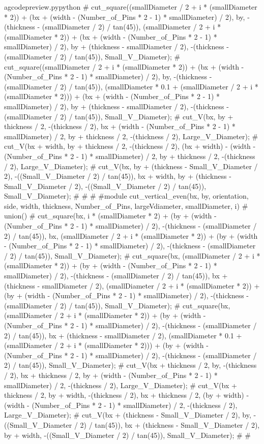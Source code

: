 \documentclass{ltxdoc}
\begin{document}
\begin{writecode}{a}{gcodepreview.py}{python}
{{#    cut_square((smallDiameter / 2 + i * (smallDiameter * 2)) + (bx + (width - (Number_of_Pins * 2 - 1) * smallDiameter) / 2), by, -(thickness - (smallDiameter / 2) / tan(45)), (smallDiameter / 2 + i * (smallDiameter * 2)) + (bx + (width - (Number_of_Pins * 2 - 1) * smallDiameter) / 2), by + (thickness - smallDiameter / 2), -(thickness - (smallDiameter / 2) / tan(45)), Small_V_Diameter);
#    cut_square((smallDiameter / 2 + i * (smallDiameter * 2)) + (bx + (width - (Number_of_Pins * 2 - 1) * smallDiameter) / 2), by, -(thickness - (smallDiameter / 2) / tan(45)), (smallDiameter * 0.1 + (smallDiameter / 2 + i * (smallDiameter * 2))) + (bx + (width - (Number_of_Pins * 2 - 1) * smallDiameter) / 2), by + (thickness - smallDiameter / 2), -(thickness - (smallDiameter / 2) / tan(45)), Small_V_Diameter);
#    cut_V(bx, by + thickness / 2, -(thickness / 2), bx + (width - (Number_of_Pins * 2 - 1) * smallDiameter) / 2, by + thickness / 2, -(thickness / 2), Large_V_Diameter);
#    cut_V(bx + width, by + thickness / 2, -(thickness / 2), (bx + width) - (width - (Number_of_Pins * 2 - 1) * smallDiameter) / 2, by + thickness / 2, -(thickness / 2), Large_V_Diameter);
#    cut_V(bx, by + (thickness - Small_V_Diameter / 2), -((Small_V_Diameter / 2) / tan(45)), bx + width, by + (thickness - Small_V_Diameter / 2), -((Small_V_Diameter / 2) / tan(45)), Small_V_Diameter);
#  }
#}
#
#module cut_vertical_even(bx, by, orientation, side, width, thickness, Number_of_Pins, largeVdiameter, smallDiameter, i) {
#  union(){
#    cut_square(bx, i * (smallDiameter * 2) + (by + (width - (Number_of_Pins * 2 - 1) * smallDiameter) / 2), -(thickness - (smallDiameter / 2) / tan(45)), bx, (smallDiameter / 2 + i * (smallDiameter * 2)) + (by + (width - (Number_of_Pins * 2 - 1) * smallDiameter) / 2), -(thickness - (smallDiameter / 2) / tan(45)), Small_V_Diameter);
#    cut_square(bx, (smallDiameter / 2 + i * (smallDiameter * 2)) + (by + (width - (Number_of_Pins * 2 - 1) * smallDiameter) / 2), -(thickness - (smallDiameter / 2) / tan(45)), bx + (thickness - smallDiameter / 2), (smallDiameter / 2 + i * (smallDiameter * 2)) + (by + (width - (Number_of_Pins * 2 - 1) * smallDiameter) / 2), -(thickness - (smallDiameter / 2) / tan(45)), Small_V_Diameter);
#    cut_square(bx, (smallDiameter / 2 + i * (smallDiameter * 2)) + (by + (width - (Number_of_Pins * 2 - 1) * smallDiameter) / 2), -(thickness - (smallDiameter / 2) / tan(45)), bx + (thickness - smallDiameter / 2), (smallDiameter * 0.1 + (smallDiameter / 2 + i * (smallDiameter * 2))) + (by + (width - (Number_of_Pins * 2 - 1) * smallDiameter) / 2), -(thickness - (smallDiameter / 2) / tan(45)), Small_V_Diameter);
#    cut_V(bx + thickness / 2, by, -(thickness / 2), bx + thickness / 2, by + (width - (Number_of_Pins * 2 - 1) * smallDiameter) / 2, -(thickness / 2), Large_V_Diameter);
#    cut_V(bx + thickness / 2, by + width, -(thickness / 2), bx + thickness / 2, (by + width) - (width - (Number_of_Pins * 2 - 1) * smallDiameter) / 2, -(thickness / 2), Large_V_Diameter);
#    cut_V(bx + (thickness - Small_V_Diameter / 2), by, -((Small_V_Diameter / 2) / tan(45)), bx + (thickness - Small_V_Diameter / 2), by + width, -((Small_V_Diameter / 2) / tan(45)), Small_V_Diameter);
#  }
#}


\end{writecode}
\end{document}
